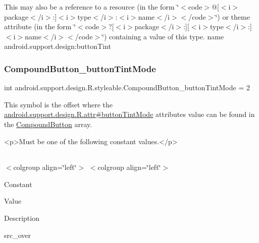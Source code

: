 This may also be a reference to a resource (in the form \char`\"{}$<$code$>$@\mbox{[}$<$i$>$package$<$/i$>$\+:\mbox{]}$<$i$>$type$<$/i$>$\+:$<$i$>$name$<$/i$>$$<$/code$>$\char`\"{}) or theme attribute (in the form \char`\"{}$<$code$>$?\mbox{[}$<$i$>$package$<$/i$>$\+:\mbox{]}\mbox{[}$<$i$>$type$<$/i$>$\+:\mbox{]}$<$i$>$name$<$/i$>$$<$/code$>$\char`\"{}) containing a value of this type.  name android.\+support.\+design\+:button\+Tint \mbox{\label{classandroid_1_1support_1_1design_1_1R_1_1styleable_a61a4f9064091d383cddade36d380b0b7}} 
\subsubsection{\texorpdfstring{Compound\+Button\+\_\+button\+Tint\+Mode}{CompoundButton\_buttonTintMode}}
{\footnotesize\ttfamily int android.\+support.\+design.\+R.\+styleable.\+Compound\+Button\+\_\+button\+Tint\+Mode = 2\hspace{0.3cm}{\ttfamily [static]}}

This symbol is the offset where the \hyperlink{classandroid_1_1support_1_1design_1_1R_1_1attr_a8f45cc6e039e1e19c4c368e82b8e4939}{android.\+support.\+design.\+R.\+attr\#button\+Tint\+Mode} attribute\textquotesingle{}s value can be found in the \hyperlink{classandroid_1_1support_1_1design_1_1R_1_1styleable_a1e3ef000b9dccc62673df5ec6d13a547}{Compound\+Button} array.

\begin{DoxyVerb}      <p>Must be one of the following constant values.</p>
\end{DoxyVerb}
 \tabulinesep=1mm
\begin{longtabu} spread 0pt [c]{*{0}{|X[-1]}|}
\hline
\end{longtabu}
$<$colgroup align=\char`\"{}left\char`\"{}$>$ $<$colgroup align=\char`\"{}left\char`\"{}$>$ 

Constant

Value

Description 

{\ttfamily src\+\_\+over}

